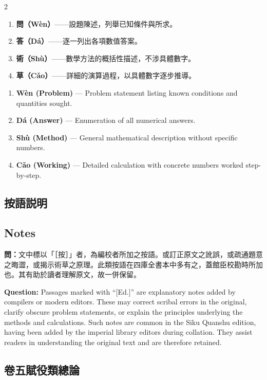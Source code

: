 \documentclass[11pt,a4paper]{article}
\newcommand{\QuestionText}[1]{\par\noindent\textbf{\color{problemcolor}問：}#1\par}
\newcommand{\QuestionEn}[1]{\par\noindent\textbf{\color{problemcolor}Question:} #1\par}
\begin{document}
\begin{paracol}{2}
\begin{enumerate}[leftmargin=1.5em]
\item \textbf{問（W\`{e}n）}——設題陳述，列舉已知條件與所求。
\item \textbf{答（D\'{a}）}——逐一列出各項數值答案。
\item \textbf{術（Sh\`{u}）}——數學方法的概括性描述，不涉具體數字。
\item \textbf{草（C\v{a}o）}——詳細的演算過程，以具體數字逐步推導。
\end{enumerate}
\switchcolumn
\begin{enumerate}[leftmargin=1.5em]
\item \textbf{W\`{e}n (Problem)} --- Problem statement listing known conditions and quantities sought.
\item \textbf{D\'{a} (Answer)} --- Enumeration of all numerical answers.
\item \textbf{Sh\`{u} (Method)} --- General mathematical description without specific numbers.
\item \textbf{C\v{a}o (Working)} --- Detailed calculation with concrete numbers worked step-by-step.
\end{enumerate}
\switchcolumn*

\subsection*{按語説明}
\switchcolumn
\subsection*{Notes}
\switchcolumn*

\QuestionText{文中標以「［按］」者，為編校者所加之按語。或訂正原文之訛誤，或疏通題意之晦澀，或揭示術草之原理。此類按語在四庫全書本中多有之，蓋館臣校勘時所加也。其有助於讀者理解原文，故一併保留。}
\switchcolumn
\QuestionEn{Passages marked with ``[Ed.]'' are explanatory notes added by compilers or modern editors. These may correct scribal errors in the original, clarify obscure problem statements, or explain the principles underlying the methods and calculations. Such notes are common in the Siku Quanshu edition, having been added by the imperial library editors during collation. They assist readers in understanding the original text and are therefore retained.}
\switchcolumn*

\subsection*{卷五賦役類總論}
\switchcolumn

\end{paracol}
\end{document}
